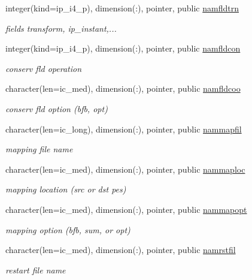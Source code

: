 \begin{DoxyCompactItemize}
integer(kind=ip\+\_\+i4\+\_\+p), dimension(\+:), pointer, public \hyperlink{namespacemod__oasis__namcouple_a5f81bc00e6dc045770edd4093f68278c}{namfldtrn}
\begin{DoxyCompactList}\small\item\em fields transform, ip\+\_\+instant,... \end{DoxyCompactList}\item 
integer(kind=ip\+\_\+i4\+\_\+p), dimension(\+:), pointer, public \hyperlink{namespacemod__oasis__namcouple_a96aa6a31ef021468f807819a84b327c3}{namfldcon}
\begin{DoxyCompactList}\small\item\em conserv fld operation \end{DoxyCompactList}\item 
character(len=ic\+\_\+med), dimension(\+:), pointer, public \hyperlink{namespacemod__oasis__namcouple_a119b86702766d5392cb44856448bcd3e}{namfldcoo}
\begin{DoxyCompactList}\small\item\em conserv fld option (bfb, opt) \end{DoxyCompactList}\item 
character(len=ic\+\_\+long), dimension(\+:), pointer, public \hyperlink{namespacemod__oasis__namcouple_a9fc6ac674a8cfa68d9d15ad13213e21d}{nammapfil}
\begin{DoxyCompactList}\small\item\em mapping file name \end{DoxyCompactList}\item 
character(len=ic\+\_\+med), dimension(\+:), pointer, public \hyperlink{namespacemod__oasis__namcouple_a7316d7d322da7cf10f315e38c145ebbb}{nammaploc}
\begin{DoxyCompactList}\small\item\em mapping location (src or dst pes) \end{DoxyCompactList}\item 
character(len=ic\+\_\+med), dimension(\+:), pointer, public \hyperlink{namespacemod__oasis__namcouple_ad2554b4881fa63780dd5e6fe78d705ef}{nammapopt}
\begin{DoxyCompactList}\small\item\em mapping option (bfb, sum, or opt) \end{DoxyCompactList}\item 
character(len=ic\+\_\+med), dimension(\+:), pointer, public \hyperlink{namespacemod__oasis__namcouple_a54f4b8262f809a20928092782bc78345}{namrstfil}
\begin{DoxyCompactList}\small\item\em restart file name \end{DoxyCompactList}\item 

\end{DoxyCompactItemize}
